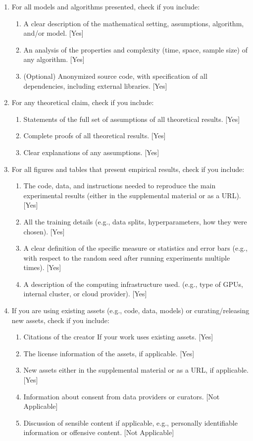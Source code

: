 \documentclass[twoside]{article}
\theoremstyle{definition}
\theoremstyle{remark}
\begin{document}
\begin{enumerate}

  \item For all models and algorithms presented, check if you include:
  \begin{enumerate}
    \item A clear description of the mathematical setting, assumptions, algorithm, and/or model. [Yes]
    \item An analysis of the properties and complexity (time, space, sample size) of any algorithm. [Yes]
    \item (Optional) Anonymized source code, with specification of all dependencies, including external libraries. [Yes]
  \end{enumerate}

  \item For any theoretical claim, check if you include:
  \begin{enumerate}
    \item Statements of the full set of assumptions of all theoretical results. [Yes]
    \item Complete proofs of all theoretical results. [Yes]
    \item Clear explanations of any assumptions. [Yes]     
  \end{enumerate}

  \item For all figures and tables that present empirical results, check if you include:
  \begin{enumerate}
    \item The code, data, and instructions needed to reproduce the main experimental results (either in the supplemental material or as a URL). [Yes]
    \item All the training details (e.g., data splits, hyperparameters, how they were chosen). [Yes]
    \item A clear definition of the specific measure or statistics and error bars (e.g., with respect to the random seed after running experiments multiple times). [Yes]
    \item A description of the computing infrastructure used. (e.g., type of GPUs, internal cluster, or cloud provider). [Yes]
  \end{enumerate}

  \item If you are using existing assets (e.g., code, data, models) or curating/releasing new assets, check if you include:
  \begin{enumerate}
    \item Citations of the creator If your work uses existing assets. [Yes]
    \item The license information of the assets, if applicable. [Yes]
    \item New assets either in the supplemental material or as a URL, if applicable. [Yes]
    \item Information about consent from data providers or curators. [Not Applicable]
    \item Discussion of sensible content if applicable, e.g., personally identifiable information or offensive content. [Not Applicable]
  \end{enumerate}


\end{enumerate}
\end{document}
